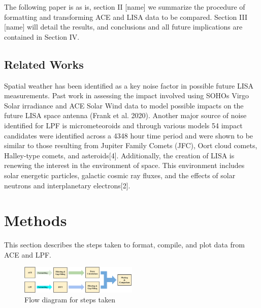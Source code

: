 \documentclass[%
 reprint,
 amsmath,amssymb,
 aps,
]{revtex4-2}
\begin{document}
The following paper is as is, section II [name] we summarize the procedure of formatting and transforming ACE and LISA data to be compared. Section III [name] will detail the results, and conclusions and all future implications are contained in Section IV. \\

\subsection{\label{sec:level2}Related Works}
Spatial weather has been identified as a key noise factor in possible future LISA measurements. Past work in assessing the impact involved using SOHOs Virgo Solar irradiance and ACE Solar Wind data to model possible impacts on the future LISA space antenna (Frank et al. 2020).
Another major source of noise identified for LPF is micrometeoroids and through various models 54 impact candidates were identified across a 4348 hour time period and were shown to be similar to those resulting from Jupiter Family Comets (JFC), Oort cloud comets, Halley-type comets, and asteroids[4]. 
Additionally, the creation of LISA is renewing the interest in the environment of space. This environment includes solar energetic particles, galactic cosmic ray fluxes, and the effects of solar neutrons and interplanetary electrons[2]. 

\section{Methods}
This section describes the steps taken to format, compile, and plot data from ACE and LPF.
\begin{figure}[htbp]
\centerline{\includegraphics[width=0.5\textwidth]{fig1solWmam.jpg}}
\caption{Flow diagram for steps taken}
\label{fig}
\end{figure}
\end{document}
